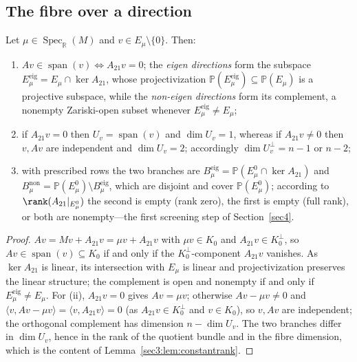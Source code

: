 \subsection{The fibre over a direction}
\label{sec3:sub:strata}
\label{sec3:sub:constrank}
\label{sec3:sub:fibre}
\begin{prop}
\label{sec3:lem:eigen}
\label{sec3:prop:strata}
\label{sec3:lem:dimU}
\label{sec3:rem:rankcases}
Let $\mu\in\operatorname{Spec}_{\mathbb{R}}(M)$ and $v\in E_\mu\setminus\{0\}$. Then:
\begin{enumerate}[label=(\roman*),leftmargin=*,itemsep=1pt,topsep=2pt]
\item $Av\in\operatorname{span}(v)\iff A_{21}v=0$; the \emph{eigen directions} form the subspace
$E_\mu^{\mathrm{eig}}=E_\mu\cap\ker A_{21}$, whose projectivization
$\mathbb{P}(E_\mu^{\mathrm{eig}})\subseteq\mathbb{P}(E_\mu)$ is a projective subspace, while the
\emph{non-eigen directions} form its complement, a nonempty Zariski-open subset whenever
$E_\mu^{\mathrm{eig}}\ne E_\mu$;
\item if $A_{21}v=0$ then $U_v=\operatorname{span}(v)$ and $\dim U_v=1$, whereas if $A_{21}v\ne0$ then
$v,Av$ are independent and $\dim U_v=2$; accordingly $\dim U_v^\perp=n-1$ or $n-2$;
\item with prescribed rows the two branches are $B_\mu^{\mathrm{eig}}=\mathbb{P}(E_\mu^0\cap\ker A_{21})$
and $B_\mu^{\mathrm{non}}=\mathbb{P}(E_\mu^0)\setminus B_\mu^{\mathrm{eig}}$, which are disjoint and
cover $\mathbb{P}(E_\mu^0)$; according to $\rank(A_{21}|_{E_\mu^0})$ the second is empty (rank zero),
the first is empty (full rank), or both are nonempty—the first screening step of
Section~\ref{sec4}.
\end{enumerate}
\end{prop}
\begin{proof}
$Av=Mv+A_{21}v=\mu v+A_{21}v$ with $\mu v\in K_0$ and $A_{21}v\in K_0^\perp$, so
$Av\in\operatorname{span}(v)\subseteq K_0$ if and only if the $K_0^\perp$-component $A_{21}v$ vanishes.
As $\ker A_{21}$ is linear, its intersection with $E_\mu$ is linear and projectivization preserves the
linear structure; the complement is open and nonempty if and only if
$E_\mu^{\mathrm{eig}}\ne E_\mu$. For (ii), $A_{21}v=0$ gives $Av=\mu v$; otherwise $Av-\mu v\ne0$ and
$\langle v,Av-\mu v\rangle=\langle v,A_{21}v\rangle=0$ (as $A_{21}v\in K_0^\perp$ and $v\in K_0$), so
$v,Av$ are independent; the orthogonal complement has dimension $n-\dim U_v$. The two branches differ
in $\dim U_v$, hence in the rank of the quotient bundle and in the fibre dimension, which is the
content of Lemma~\ref{sec3:lem:constantrank}.
\end{proof}

